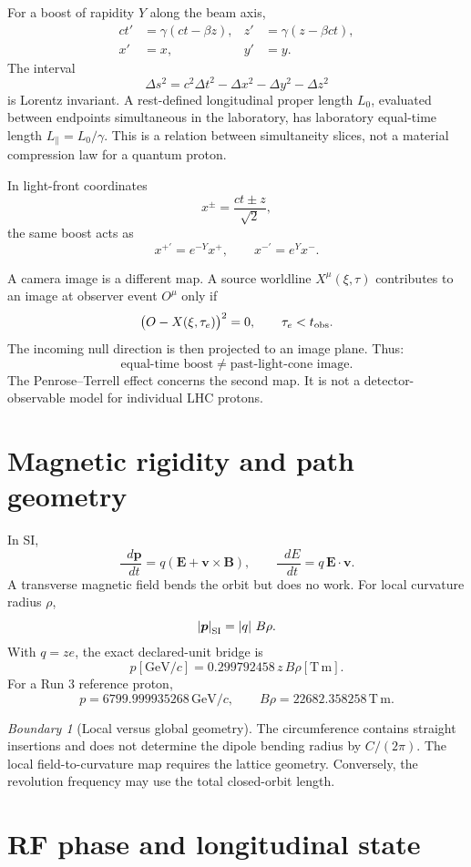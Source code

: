 \documentclass[11pt,a4paper]{article}
\theoremstyle{definition}
\theoremstyle{plain}
\theoremstyle{remark}
\newtheorem{warning}[definition]{Boundary}
\newcommand{\dd}{\mathop{}\!d}
\newcommand{\abs}[1]{\left\lvert #1\right\rvert}
\newcommand{\GeV}{\mathrm{GeV}}
\begin{document}
For a boost of rapidity \(Y\) along the beam axis,
\[
\begin{aligned}
ct'&=\gamma(ct-\beta z),&
z'&=\gamma(z-\beta ct),\\
x'&=x,&y'&=y.
\end{aligned}
\]
The interval
\[
\Delta s^2=c^2\Delta t^2-\Delta x^2-\Delta y^2-\Delta z^2
\]
is Lorentz invariant. A rest-defined longitudinal proper length
\(L_0\), evaluated between endpoints simultaneous in the laboratory,
has laboratory equal-time length \(L_\parallel=L_0/\gamma\).
This is a relation between simultaneity slices, not a material
compression law for a quantum proton.

In light-front coordinates
\[
x^\pm=\frac{ct\pm z}{\sqrt2},
\]
the same boost acts as
\[
x^{+\prime}=e^{-Y}x^+,\qquad
x^{-\prime}=e^Yx^-.
\]

A camera image is a different map. A source worldline
\(X^\mu(\xi,\tau)\) contributes to an image at observer event
\(O^\mu\) only if
\[
\bigl(O-X(\xi,\tau_e)\bigr)^2=0,\qquad \tau_e<t_{\rm obs}.
\]
The incoming null direction is then projected to an image plane.
Thus:
\[
\text{equal-time boost}\ne\text{past-light-cone image}.
\]
The Penrose--Terrell effect concerns the second map. It is not a
detector-observable model for individual LHC protons.

\section{Magnetic rigidity and path geometry}

In SI,
\[
\frac{\dd\bm p}{\dd t}
=q(\bm E+\bm v\times\bm B),\qquad
\frac{\dd E}{\dd t}=q\,\bm E\cdot\bm v.
\]
A transverse magnetic field bends the orbit but does no work.
For local curvature radius \(\rho\),
\[
\abs{\bm p}_{\rm SI}=\abs q\,B\rho.
\]
With \(q=ze\), the exact declared-unit bridge is
\[
\boxed{
p[\GeV/c]=0.299792458\,z\,B\rho[\mathrm{T\,m}].
}
\]
For a Run 3 reference proton,
\[
p=6799.999935268\,\GeV/c,\qquad
B\rho=22682.358258\,\mathrm{T\,m}.
\]

\begin{warning}[Local versus global geometry]
The circumference contains straight insertions and does not determine
the dipole bending radius by \(C/(2\pi)\). The local field-to-curvature
map requires the lattice geometry. Conversely, the revolution
frequency may use the total closed-orbit length.
\end{warning}

\section{RF phase and longitudinal state}
\end{document}
